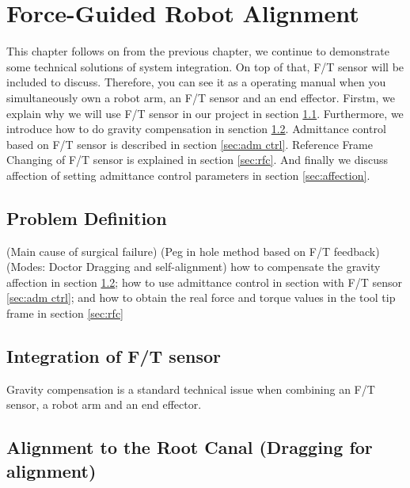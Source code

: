 \chapter{Force-Guided Robot Alignment}
This chapter follows on from the previous chapter, we continue to demonstrate some technical solutions of system integration. On top of that, F/T sensor will be included to discuss. Therefore, you can see it as a operating manual when you simultaneously own a robot arm, an F/T sensor and an end effector. Firstm, we explain why we will use F/T sensor in our project in section \ref{sec:pro def}. Furthermore, we introduce how to do gravity compensation in senction \ref{sec:grav compen}. Admittance control based on F/T sensor is described in section \ref{sec:adm ctrl}. Reference Frame Changing of F/T sensor is explained in section \ref{sec:rfc}. And finally we discuss affection of setting admittance control parameters in section \ref{sec:affection}.
\section{Problem Definition}
\label{sec:pro def}
(Main cause of surgical failure)
(Peg in hole method based on F/T feedback)
(Modes: Doctor Dragging and self-alignment)
how to compensate the gravity affection in section \ref{sec:grav compen}; how to use admittance control in section with F/T sensor \ref{sec:adm ctrl}; and how to obtain the real force and torque values in the tool tip frame in section \ref{sec:rfc}
\section{Integration of F/T sensor}
\label{sec:grav compen}
Gravity compensation is a standard technical issue when combining an F/T sensor, a robot arm and an end effector.
\section{Alignment to the Root Canal (Dragging for alignment)}
